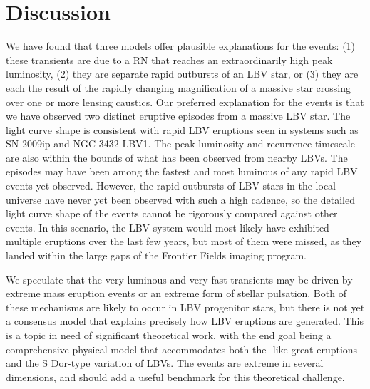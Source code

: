 \section{Discussion}\label{sec:Discussion}

We have found that three models offer plausible explanations for the
\spock events: (1) these transients are due to a RN that reaches an
extraordinarily high peak luminosity, (2) they are separate rapid
outbursts of an LBV star, or (3) they are each the result of the
rapidly changing magnification of a massive star crossing over one or
more lensing caustics.  Our preferred explanation for the \spock
events is that we have observed two distinct eruptive episodes from a
massive LBV star.  The light curve shape is consistent with rapid LBV
eruptions seen in systems such as SN 2009ip and NGC 3432-LBV1.  The
peak luminosity and recurrence timescale are also within the bounds of
what has been observed from nearby LBVs.  The \spock episodes may have
been among the fastest and most luminous of any rapid LBV events yet
observed. However, the rapid outbursts of LBV stars in the local
universe have never yet been observed with such a high cadence, so the
detailed light curve shape of the \spock events cannot be rigorously
compared against other events.  In this scenario, the \spock LBV
system would most likely have exhibited multiple eruptions over the
last few years, but most of them were missed, as they landed within
the large gaps of the \HST Frontier Fields imaging program.

We speculate that the very luminous and very fast \spock transients
may be driven by extreme mass eruption events or an extreme form of
stellar pulsation.  Both of these mechanisms are likely to occur in
LBV progenitor stars, but there is not yet a consensus model that
explains precisely how LBV eruptions are generated. This is a topic in
need of significant theoretical work, with the end goal being a
comprehensive physical model that accommodates both the \etacar-like
great eruptions and the S Dor-type variation of LBVs.  The \spock
events are extreme in several dimensions, and should add a useful
benchmark for this theoretical challenge.

